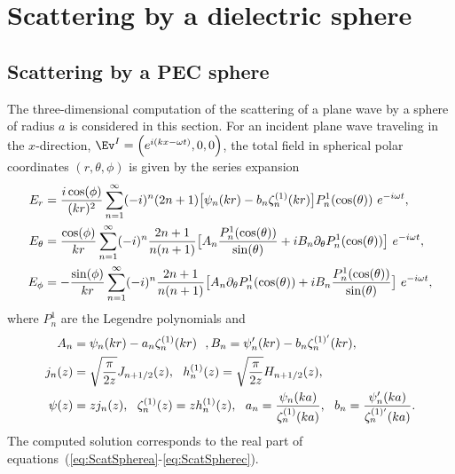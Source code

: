 \section{Scattering by a dielectric sphere}


\clearpage
\subsection{Scattering by a PEC sphere}

\newcommand{\Gs}{{\mathcal G}}


The three-dimensional computation of the scattering of a plane wave by a sphere of
radius $a$ is considered in this section.
For an incident plane wave traveling in the $x$-direction,
$\Ev^I = \Big( e^{i(kx-\omega t)}, 0, 0 \Big)$,
the total field in spherical polar coordinates $(r,\theta,\phi)$
is given by the series expansion~\cite{BowmanSeniorUslenghi1996}
\begin{align}
   E_r &= {i\cos(\phi)\over (kr)^2} 
              \sum_{n=1}^\infty (-i)^n (2n+1)\big[ \psi_n(kr) - b_n \zeta_n^{(1)}(kr)\big] P_n^1(\cos(\theta))
                           ~ e^{-i\omega t},  \label{eq:ScatSpherea}\\
   E_\theta &= {\cos(\phi)\over kr}
              \sum_{n=1}^\infty (-i)^n {2n+1 \over n(n+1)}
                 \big[ A_n {P_n^1(\cos(\theta)) \over \sin(\theta)}
                      +i B_n \partial_\theta P_n^1(\cos(\theta)) \big]~ e^{-i\omega t},  \label{eq:ScatSphereb} \\
   E_\phi &= -{\sin(\phi)\over kr}
              \sum_{n=1}^\infty (-i)^n {2n+1 \over n(n+1)}
                 \big[ A_n \partial_\theta P_n^1(\cos(\theta))
                      +i B_n {P_n^1(\cos(\theta)) \over \sin(\theta)} \big] ~ e^{-i\omega t},  \label{eq:ScatSpherec}
\end{align}
where $P_n^1$ are the Legendre polynomials and 
\begin{align*}
 A_n &= \psi_n(kr) - a_n \zeta_n^{(1)}(kr) ~~,  B_n = \psi_n'(kr) - b_n \zeta_n^{(1)'}(kr) , \\
  j_n(z) &= \sqrt{\pi\over 2 z} J_{n+1/2}(z), ~~ h_n^{(1)}(z)= \sqrt{\pi\over 2 z} H_{n+1/2}(z),  \\
  \psi(z) &= z j_n(z), ~~ \zeta_n^{(1)}(z)= z h_n^{(1)}(z), ~~ a_n={\psi_n(ka)\over \zeta_n^{(1)}(ka)}, ~~
       b_n ={\psi_n'(ka)\over \zeta_n^{(1)'}(ka)} .
\end{align*}
The computed solution corresponds to the real part of equations~(\ref{eq:ScatSpherea}-\ref{eq:ScatSpherec}). 

